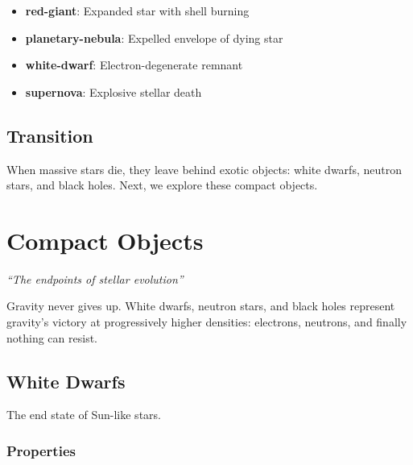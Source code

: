 \documentclass[
  11pt,
  letterpaper,
  twoside,
  openright]{book}
\providecommand{\tightlist}{%
  \setlength{\itemsep}{0pt}\setlength{\parskip}{0pt}}
\begin{document}
\begin{itemize}
\tightlist
\item
  \textbf{red-giant}: Expanded star with shell burning
\item
  \textbf{planetary-nebula}: Expelled envelope of dying star
\item
  \textbf{white-dwarf}: Electron-degenerate remnant
\item
  \textbf{supernova}: Explosive stellar death
\end{itemize}

\section{Transition}\label{transition-22}

When massive stars die, they leave behind exotic objects: white dwarfs,
neutron stars, and black holes. Next, we explore these compact objects.

\chapter{Compact Objects}\label{sec-compact-objects}

\emph{``The endpoints of stellar evolution''}

\begin{tcolorbox}[enhanced jigsaw, leftrule=.75mm, title=\textcolor{quarto-callout-note-color}{\faInfo}\hspace{0.5em}{Key Revelation}, bottomrule=.15mm, opacityback=0, coltitle=black, arc=.35mm, colframe=quarto-callout-note-color-frame, colbacktitle=quarto-callout-note-color!10!white, colback=white, titlerule=0mm, breakable, bottomtitle=1mm, toptitle=1mm, rightrule=.15mm, toprule=.15mm, left=2mm, opacitybacktitle=0.6]

Gravity never gives up. White dwarfs, neutron stars, and black holes
represent gravity's victory at progressively higher densities:
electrons, neutrons, and finally nothing can resist.

\end{tcolorbox}

\section{White Dwarfs}\label{white-dwarfs}

The end state of Sun-like stars.

\subsection{Properties}\label{properties-11}
\end{document}
